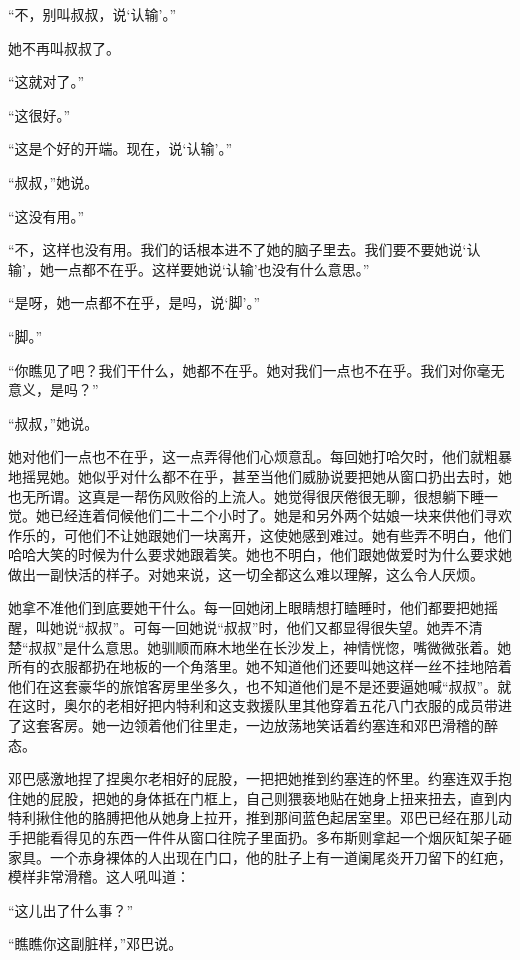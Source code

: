     “不，别叫叔叔，说‘认输’。”

    她不再叫叔叔了。

    “这就对了。”

    “这很好。”

    “这是个好的开端。现在，说‘认输’。”

    “叔叔，”她说。

    “这没有用。”

    “不，这样也没有用。我们的话根本进不了她的脑子里去。我们要不要她说‘认输’，她一点都不在乎。这样要她说‘认输’也没有什么意思。”

    “是呀，她一点都不在乎，是吗，说‘脚’。”

    “脚。”

    “你瞧见了吧？我们干什么，她都不在乎。她对我们一点也不在乎。我们对你毫无意义，是吗？”

    “叔叔，”她说。

    她对他们一点也不在乎，这一点弄得他们心烦意乱。每回她打哈欠时，他们就粗暴地摇晃她。她似乎对什么都不在乎，甚至当他们威胁说要把她从窗口扔出去时，她也无所谓。这真是一帮伤风败俗的上流人。她觉得很厌倦很无聊，很想躺下睡一觉。她已经连着伺候他们二十二个小时了。她是和另外两个姑娘一块来供他们寻欢作乐的，可他们不让她跟她们一块离开，这使她感到难过。她有些弄不明白，他们哈哈大笑的时候为什么要求她跟着笑。她也不明白，他们跟她做爱时为什么要求她做出一副快活的样子。对她来说，这一切全都这么难以理解，这么令人厌烦。

    她拿不准他们到底要她干什么。每一回她闭上眼睛想打瞌睡时，他们都要把她摇醒，叫她说“叔叔”。可每一回她说“叔叔”时，他们又都显得很失望。她弄不清楚“叔叔”是什么意思。她驯顺而麻木地坐在长沙发上，神情恍惚，嘴微微张着。她所有的衣服都扔在地板的一个角落里。她不知道他们还要叫她这样一丝不挂地陪着他们在这套豪华的旅馆客房里坐多久，也不知道他们是不是还要逼她喊“叔叔”。就在这时，奥尔的老相好把内特利和这支救援队里其他穿着五花八门衣服的成员带进了这套客房。她一边领着他们往里走，一边放荡地笑话着约塞连和邓巴滑稽的醉态。

 


    邓巴感激地捏了捏奥尔老相好的屁股，一把把她推到约塞连的怀里。约塞连双手抱住她的屁股，把她的身体抵在门框上，自己则猥亵地贴在她身上扭来扭去，直到内特利揪住他的胳膊把他从她身上拉开，推到那间蓝色起居室里。邓巴已经在那儿动手把能看得见的东西一件件从窗口往院子里面扔。多布斯则拿起一个烟灰缸架子砸家具。一个赤身裸体的人出现在门口，他的肚子上有一道阑尾炎开刀留下的红疤，模样非常滑稽。这人吼叫道：

    “这儿出了什么事？”

    “瞧瞧你这副脏样，”邓巴说。

